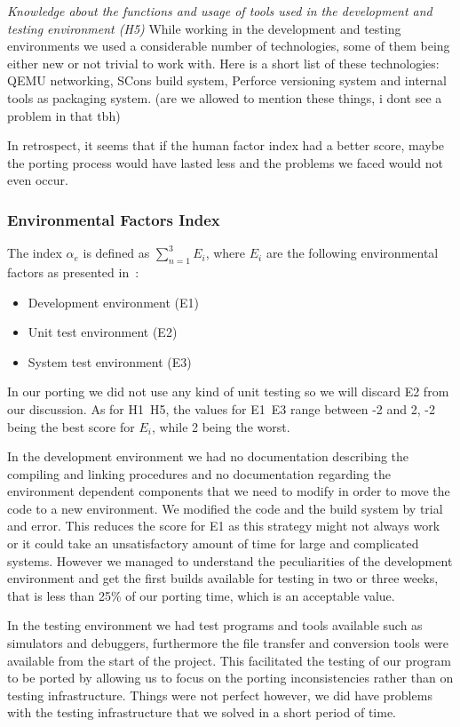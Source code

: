 \textit{Knowledge about the functions and usage of tools used in the development
and testing environment (H5)}
While working in the development and testing environments we used a considerable
number of technologies, some of them being either new or not trivial to work
with. Here is a short list of these technologies: QEMU networking, SCons build
system, Perforce versioning system and internal tools as packaging system. (are
we allowed to mention these things, i dont see a problem in that tbh)

In retrospect, it seems that if the human factor index had a better score, maybe
the porting process would have lasted less and the problems we faced would not
even occur.

\subsubsection{Environmental Factors Index}

The index $\alpha_e$ is defined as $\sum_{n=1}^{3} E_i$, where $E_i$ are the
following environmental factors as presented in~\cite{b2}:
\begin{itemize}
    \item Development environment (E1)
    \item Unit test environment (E2)
    \item System test environment (E3)
\end{itemize}

In our porting we did not use any kind of unit testing so we will discard E2
from our discussion. As for H1~H5, the values for E1~E3 range between -2 and 2,
-2 being the best score for $E_i$, while 2 being the worst.

In the development environment we had no documentation describing the compiling
and linking procedures and no documentation regarding the environment dependent
components that we need to modify in order to move the code to a new
environment. We modified the code and the build system by trial and error. This
reduces the score for E1 as this strategy might not always work or it could take
an unsatisfactory amount of time for large and complicated systems. However
we managed to understand the peculiarities of the development environment and
get the first builds available for testing in two or three weeks, that is less
than 25\% of our porting time, which is an acceptable value.

In the testing environment we had test programs and tools available such as
simulators and debuggers, furthermore the file transfer and conversion tools
were available from the start of the project. This facilitated the testing of
our program to be ported by allowing us to focus on the porting inconsistencies
rather than on testing infrastructure. Things were not perfect however, we did
have problems with the testing infrastructure that we solved in a short period
of time.

